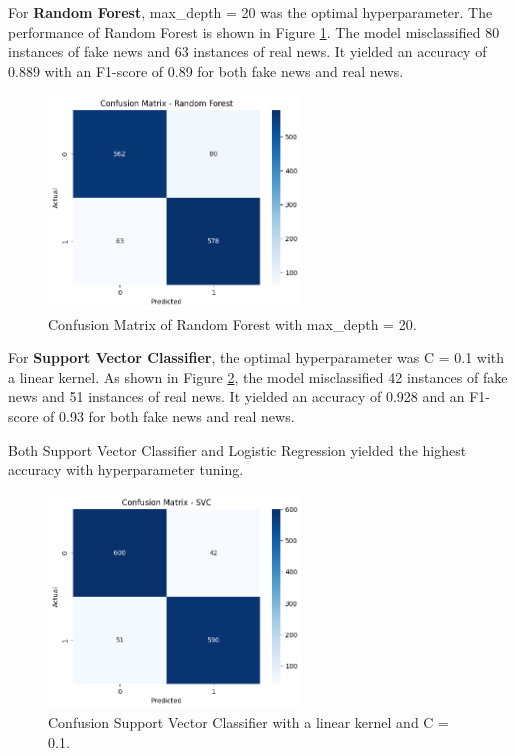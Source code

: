 For \textbf{Random Forest}, max\_depth = 20 was the optimal hyperparameter. The performance of Random Forest is shown in Figure \ref{RF_hyperparam}. The model misclassified 80 instances of fake news and 63 instances of real news. It yielded an accuracy of 0.889 with an F1-score of 0.89 for both fake news and real news.

\begin{figure}[h!]
\centering
\includegraphics[width=0.6\textwidth,height=0.6\textheight, keepaspectratio]{figures/hyperparam/RF.png}
    \caption{Confusion Matrix of Random Forest with max\_depth = 20.}
    \label{RF_hyperparam}
\end{figure}

For \textbf{Support Vector Classifier}, the optimal hyperparameter was C = 0.1 with a linear kernel. As shown in Figure \ref{SVC_hyperparam}, the model misclassified 42 instances of fake news and 51 instances of real news. It yielded an accuracy of 0.928 and an F1-score of 0.93 for both fake news and real news.

Both Support Vector Classifier and Logistic Regression yielded the highest accuracy with hyperparameter tuning.

\begin{figure}[h!]
\centering
\includegraphics[width=0.6\textwidth,height=0.6\textheight, keepaspectratio]{figures/hyperparam/SVC.png}
    \caption{Confusion Support Vector Classifier with a linear kernel and C = 0.1.}
    \label{SVC_hyperparam}
\end{figure}

